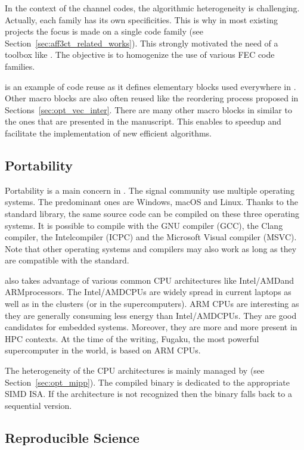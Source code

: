 In the context of the channel codes, the algorithmic heterogeneity is
challenging. Actually, each family has its own specificities. This is why in
most existing projects the focus is made on a single code family (see
Section~\ref{sec:aff3ct_related_works}). This strongly motivated the need of a
toolbox like \AFFECT. The objective is to homogenize the use of various FEC code
families.

\MIPP is an example of code reuse as it defines elementary blocks used
everywhere in \AFFECT. Other macro blocks are also often reused like the
reordering process proposed in Sections~\ref{sec:opt_vec_inter}. There are many
other macro blocks in \AFFECT similar to the ones that are presented in the
manuscript. This enables to speedup and facilitate the implementation of new
efficient algorithms.

\subsection{Portability}

Portability is a main concern in \AFFECT. The signal community use multiple
operating systems. The predominant ones are Windows, macOS and Linux. Thanks to
the  standard library, the same \AFFECT source code can be compiled on
these three operating systems. It is possible to compile with the GNU compiler
(GCC), the Clang compiler, the Intel\R \Cxx compiler (ICPC) and the Microsoft\R
Visual compiler (MSVC). Note that other operating systems and compilers may also
work as long as they are compatible with the  standard.

\AFFECT also takes advantage of various common CPU architectures like
Intel\R/AMD\R and ARM\R processors. The Intel\R/AMD\R CPUs are widely spread
in current laptops as well as in the clusters (or in the supercomputers). ARM\R
CPUs are interesting as they are generally consuming less energy than
Intel\R/AMD\R CPUs. They are good candidates for embedded systems. Moreover,
they are more and more present in HPC contexts. At the time of the writing,
Fugaku, the most powerful supercomputer in the world, is based on ARM CPUs.

The heterogeneity of the CPU architectures is mainly managed by \MIPP (see
Section~\ref{sec:opt_mipp}). The compiled binary is dedicated to the appropriate
SIMD ISA. If the architecture is not recognized then the \AFFECT binary
falls back to a sequential version.

\subsection{Reproducible Science}

